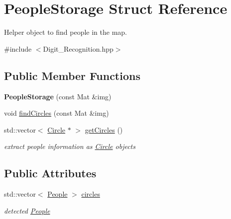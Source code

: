 \hypertarget{struct_people_storage}{}\section{People\+Storage Struct Reference}
\label{struct_people_storage}


Helper object to find people in the map.  




{\ttfamily \#include $<$Digit\+\_\+\+Recognition.\+hpp$>$}

\subsection*{Public Member Functions}
\begin{DoxyCompactItemize}
\item 
\mbox{\label{struct_people_storage_a6aa999011975c71c5dac2c011d0fba4c}} 
{\bfseries People\+Storage} (const Mat \&img)
\item 
void \mbox{\hyperlink{struct_people_storage_a97206f5a49064a68924059861deab436}{find\+Circles}} (const Mat \&img)
\item 
\mbox{\label{struct_people_storage_a461a143e3b928603f383eccf65a79bdf}} 
std\+::vector$<$ \mbox{\hyperlink{class_circle}{Circle}} $\ast$ $>$ \mbox{\hyperlink{struct_people_storage_a461a143e3b928603f383eccf65a79bdf}{get\+Circles}} ()
\begin{DoxyCompactList}\small\item\em extract people information as \mbox{\hyperlink{class_circle}{Circle}} objects \end{DoxyCompactList}\end{DoxyCompactItemize}
\subsection*{Public Attributes}
\begin{DoxyCompactItemize}
\item 
\mbox{\label{struct_people_storage_a00dd487841221f7b5094934c1409957a}} 
std\+::vector$<$ \mbox{\hyperlink{class_people}{People}} $>$ \mbox{\hyperlink{struct_people_storage_a00dd487841221f7b5094934c1409957a}{circles}}
\begin{DoxyCompactList}\small\item\em detected \mbox{\hyperlink{class_people}{People}} \end{DoxyCompactList}\end{DoxyCompactItemize}


